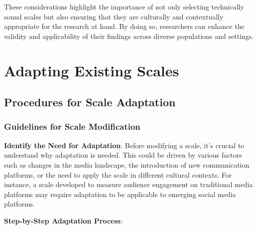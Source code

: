 \documentclass[
]{book}
\begin{document}
These considerations highlight the importance of not only selecting technically sound scales but also ensuring that they are culturally and contextually appropriate for the research at hand. By doing so, researchers can enhance the validity and applicability of their findings across diverse populations and settings.

\section*{Adapting Existing Scales}\label{adapting-existing-scales}

\subsection*{Procedures for Scale Adaptation}\label{procedures-for-scale-adaptation}

\subsubsection*{Guidelines for Scale Modification}\label{guidelines-for-scale-modification}

\textbf{Identify the Need for Adaptation}: Before modifying a scale, it's crucial to understand why adaptation is needed. This could be driven by various factors such as changes in the media landscape, the introduction of new communication platforms, or the need to apply the scale in different cultural contexts. For instance, a scale developed to measure audience engagement on traditional media platforms may require adaptation to be applicable to emerging social media platforms.

\textbf{Step-by-Step Adaptation Process}:
\end{document}
